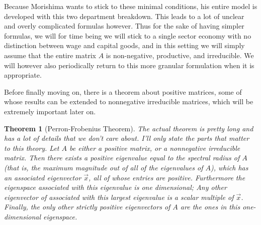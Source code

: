 \documentclass{article}
\theoremstyle{definition}
\theoremstyle{plain}
\theoremstyle{theorem}
\newtheorem{theorem}{Theorem}[section]
\begin{document}
Because Morishima wants to stick to these minimal conditions, his entire model is developed with this two department breakdown. This leads to a lot of unclear and overly complicated formulas however. Thus for the sake of having simpler formulas, we will for time being we will stick to a single sector economy with no distinction between wage and capital goods, and in this setting we will simply assume that the entire matrix $A$ is non-negative, productive, and irreducible. We will however also periodically return to this more granular formulation when it is appropriate.
\par Before finally moving on, there is a theorem about positive matrices, some of whose results can be extended to nonnegative irreducible matrices, which will be extremely important later on.
\begin{theorem}[Perron-Frobenius Theorem]
	The actual theorem is pretty long and has a lot of details that we don't care about. I'll only state the parts that matter to this theory. Let $A$ be either a positive matrix, or a nonnegative irreducible matrix. Then there exists a positive eigenvalue equal to the spectral radius of $A$ (that is, the maximum magnitude out of all of the eigenvalues of $A$), which has an associated eigenvector $\vec{x}$, all of whose entries are positive. Furthermore the eigenspace associated with this eigenvalue is one dimensional; Any other eigenvector of associated with this largest eigenvalue is a scalar multiple of $\vec{x}$. Finally, the \emph{only} other strictly positive eigenvectors of $A$ are the ones in this one-dimensional eigenspace. 
\end{theorem}
\end{document}
